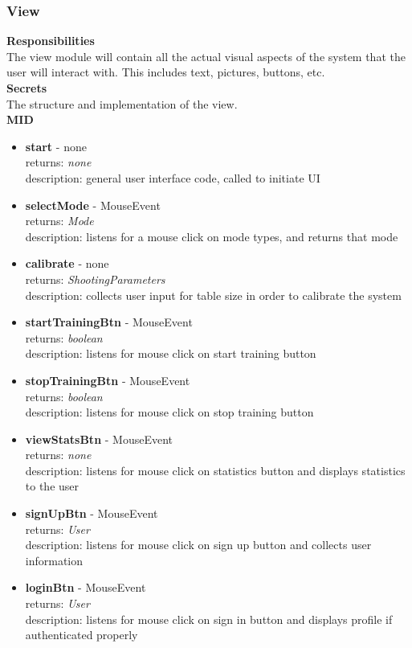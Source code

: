 \documentclass[11pt]{article}
\begin{document}
\subsubsection*{View}
\textbf{Responsibilities} \\
The view module will contain all the actual visual aspects of the system that the user will interact with. This includes text, pictures, buttons, etc. \\
\textbf{Secrets} \\
The structure and implementation of the view. \\
\textbf{MID}
\begin{itemize}
\item \textbf{start} - none \\ returns: \textit{none} \\ description: general user interface code, called to initiate UI
\item \textbf{selectMode} - MouseEvent \\ returns: \textit{Mode} \\ description: listens for a mouse click on mode types, and returns that mode
\item \textbf{calibrate} - none \\ returns: \textit{ShootingParameters} \\ description: collects user input for table size in order to calibrate the system
\item \textbf{startTrainingBtn} - MouseEvent \\ returns: \textit{boolean} \\ description: listens for mouse click on start training button
\item \textbf{stopTrainingBtn} - MouseEvent \\ returns: \textit{boolean} \\ description: listens for mouse click on stop training button
\item \textbf{viewStatsBtn} - MouseEvent \\ returns: \textit{none} \\ description: listens for mouse click on statistics button and displays statistics to the user
\item \textbf{signUpBtn} - MouseEvent \\ returns: \textit{User} \\ description: listens for mouse click on sign up button and collects user information
\item \textbf{loginBtn} - MouseEvent \\ returns: \textit{User} \\ description: listens for mouse click on sign in button and displays profile if authenticated properly
\end{itemize}
\end{document}
